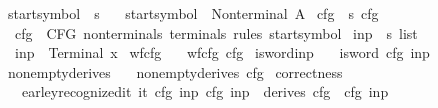 \begin{isabellebody}
\ start{\isacharunderscore}{\kern0pt}symbol{}\ {\isacharcolon}{\kern0pt}{\isacharcolon}{\kern0pt}\ s{}\ \isanewline
\ \ {\isachardoublequoteopen}start{\isacharunderscore}{\kern0pt}symbol{}\ {\isacharequal}{\kern0pt}\ Nonterminal\ A{\isachardoublequoteclose}\isanewline
\isanewline
{}\isamarkupfalse%
\ cfg{}\ {\isacharcolon}{\kern0pt}{\isacharcolon}{\kern0pt}\ {\isachardoublequoteopen}s{}\ cfg{\isachardoublequoteclose}\ \isanewline
\ \ {\isachardoublequoteopen}cfg{}\ {\isacharequal}{\kern0pt}\ CFG\ nonterminals{}\ terminals{}\ rules{}\ start{\isacharunderscore}{\kern0pt}symbol{}{\isachardoublequoteclose}\isanewline
\isanewline
{}\isamarkupfalse%
\ inp{}\ {\isacharcolon}{\kern0pt}{\isacharcolon}{\kern0pt}\ {\isachardoublequoteopen}s{}\ list{\isachardoublequoteclose}\ \isanewline
\ \ {\isachardoublequoteopen}inp{}\ {\isacharequal}{\kern0pt}\ {\isacharbrackleft}{\kern0pt}Terminal\ x{\isacharbrackright}{\kern0pt}{\isachardoublequoteclose}\isanewline
\isanewline
{}\isamarkupfalse%
\ wf{\isacharunderscore}{\kern0pt}cfg{}{\isacharcolon}{\kern0pt}\isanewline
\ \ \ {\isachardoublequoteopen}wf{\isacharunderscore}{\kern0pt}cfg\ cfg{}{\isachardoublequoteclose}%
\isadelimproof
%
\endisadelimproof
%
\isatagproof
%
\endisatagproof
{\isafoldproof}%
%
\isadelimproof
\isanewline
%
\endisadelimproof
{}\isamarkupfalse%
\ is{\isacharunderscore}{\kern0pt}word{\isacharunderscore}{\kern0pt}inp{}{\isacharcolon}{\kern0pt}\isanewline
\ \ \ {\isachardoublequoteopen}is{\isacharunderscore}{\kern0pt}word\ cfg{}\ inp{}{\isachardoublequoteclose}%
\isadelimproof
%
\endisadelimproof
%
\isatagproof
%
\endisatagproof
{\isafoldproof}%
%
\isadelimproof
\isanewline
%
\endisadelimproof
{}\isamarkupfalse%
\ nonempty{\isacharunderscore}{\kern0pt}derives{}{\isacharcolon}{\kern0pt}\isanewline
\ \ \ {\isachardoublequoteopen}nonempty{\isacharunderscore}{\kern0pt}derives\ cfg{}{\isachardoublequoteclose}%
\isadelimproof
%
\endisadelimproof
%
\isatagproof
%
\endisatagproof
{\isafoldproof}%
%
\isadelimproof
\isanewline
%
\endisadelimproof
{}\isamarkupfalse%
\ correctness{}{\isacharcolon}{\kern0pt}\isanewline
\ \ \ {\isachardoublequoteopen}earley{\isacharunderscore}{\kern0pt}recognized{\isacharunderscore}{\kern0pt}it\ {\isacharparenleft}{\kern0pt}{\isasymII}{\isacharunderscore}{\kern0pt}it\ cfg{}\ inp{}{\isacharparenright}{\kern0pt}\ cfg{}\ inp{}\ {\isasymlongleftrightarrow}\ derives\ cfg{}\ {\isacharbrackleft}{\kern0pt}{\isasymSS}\ cfg{}{\isacharbrackright}{\kern0pt}\ inp{}{\isachardoublequoteclose}%

\end{isabellebody}
